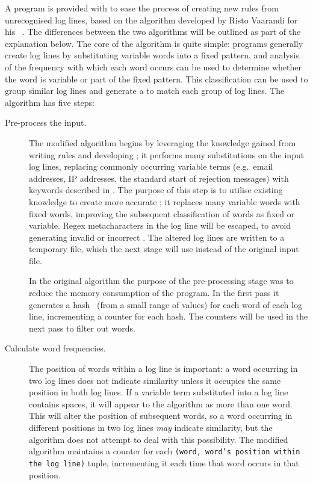 A program is provided with \parsername{} to ease the process of creating
new rules from unrecognised log lines, based on the algorithm developed by
Risto Vaarandi for his ~\cite{slct-paper}.  The differences
between the two algorithms will be outlined as part of the explanation
below.  The core of the  algorithm is quite simple: programs
generally create log lines by substituting variable words into a fixed
pattern, and analysis of the frequency with which each word occurs can be
used to determine whether the word is variable or part of the fixed
pattern.  This classification can be used to group similar log lines and
generate a  to match each group of log lines.  The algorithm
has five steps:

\begin{description}

    \item [Pre-process the input.]  The modified algorithm begins by
        leveraging the knowledge gained from writing rules and developing
        \parsername{}; it performs many substitutions on the input log
        lines, replacing commonly occurring variable terms (e.g.\ email
        addresses, IP addresses, the standard start of rejection messages)
        with keywords described in .  The
        purpose of this step is to utilise existing knowledge to create
        more accurate \regexes{}; it replaces many variable words with
        fixed words, improving the subsequent classification of words as
        fixed or variable.  Regex metacharacters in the log line will be
        escaped, to avoid generating invalid or incorrect \regexes{}.  The
        altered log lines are written to a temporary file, which the next
        stage will use instead of the original input file.

        In the original algorithm the purpose of the pre-processing stage
        was to reduce the memory consumption of the program.  In the first
        pass it generates a hash~\cite{hash-functions} (from a
        small range of values) for each word of each log line, incrementing
        a counter for each hash.  The counters will be used in the next
        pass to filter out words.

    \item [Calculate word frequencies.]  The position of words within a log
        line is important: a word occurring in two log lines does not
        indicate similarity unless it occupies the same position in both
        log lines.  If a variable term substituted into a log line contains
        spaces, it will appear to the algorithm as more than one word.
        This will alter the position of subsequent words, so a word
        occurring in different positions in two log lines \textit{may\/}
        indicate similarity, but the algorithm does not attempt to deal
        with this possibility.  The modified algorithm maintains a counter
        for each \texttt{(word, word's position within the log line)}
        tuple, incrementing it each time that word occurs in that position.


\end{description}
